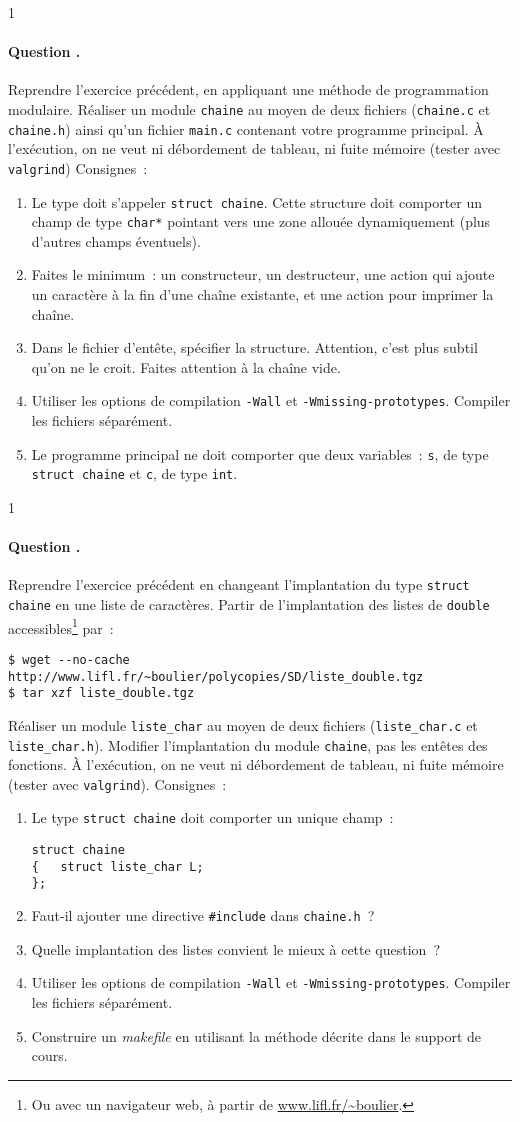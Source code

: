 \documentclass[12pt]{article}
\newcounter{question_counter}
\newcommand{\question}{\addtocounter{question_counter}1 %
    \paragraph{\bf Question \arabic{question_counter}.}}
\begin{document}
\question
Reprendre l'exercice précédent, en appliquant une méthode de programmation
modulaire. Réaliser un module \texttt{chaine} au moyen de deux fichiers
(\texttt{chaine.c} et \texttt{chaine.h}) ainsi qu'un fichier \texttt{main.c}
contenant votre programme principal. À l'exécution, on ne veut ni 
débordement de tableau, ni fuite mémoire (tester avec \texttt{valgrind})
Consignes~:
\begin{enumerate}
\item	Le type doit s'appeler \texttt{struct chaine}. Cette structure
	doit comporter un champ de type \texttt{char*} pointant vers
	une zone allouée dynamiquement (plus d'autres champs éventuels).
\item	Faites le minimum~: un constructeur, un destructeur, une
	action qui ajoute un caractère à la fin d'une chaîne existante,
	et une action pour imprimer la chaîne.
\item	Dans le fichier d'entête, spécifier la structure. Attention,
	c'est plus subtil qu'on ne le croit. Faites attention à la
	chaîne vide.
\item	Utiliser les options de
        compilation \texttt{-Wall} et \texttt{-Wmissing-prototypes}.
	Compiler les fichiers séparément. 
\item	Le programme principal ne doit comporter que deux variables~:
	{\tt s}, de type \texttt{struct chaine} et {\tt c}, de type
	\texttt{int}.
\end{enumerate}

\question
Reprendre l'exercice précédent en changeant l'implantation du 
type \texttt{struct chaine} en une liste de caractères. 
Partir de l'implantation des listes de {\tt double} 
accessibles\footnote{Ou avec un navigateur web, à partir de
\url{www.lifl.fr/~boulier}.} par~:
\begin{verbatim}
$ wget --no-cache http://www.lifl.fr/~boulier/polycopies/SD/liste_double.tgz
$ tar xzf liste_double.tgz
\end{verbatim}
Réaliser un module \texttt{liste\_char} au moyen de deux fichiers
(\texttt{liste\_char.c} et \texttt{liste\_char.h}).
Modifier l'implantation du module \texttt{chaine}, pas les entêtes des
fonctions. À l'exécution, on ne veut ni débordement de tableau, ni fuite 
mémoire (tester avec \texttt{valgrind}). Consignes~:
\begin{enumerate}
\item	Le type \texttt{struct chaine} doit comporter un unique champ~:
\begin{verbatim}
struct chaine 
{   struct liste_char L;
};
\end{verbatim}
\item	Faut-il ajouter une directive \texttt{\#include} dans \texttt{chaine.h}~?
\item	Quelle implantation des listes convient le mieux à cette question~?
\item	Utiliser les options de
        compilation \texttt{-Wall} et \texttt{-Wmissing-prototypes}.
	Compiler les fichiers séparément. 
\item	Construire un {\em makefile} en utilisant la méthode décrite
	dans le support de cours.
\end{enumerate}
\end{document}
